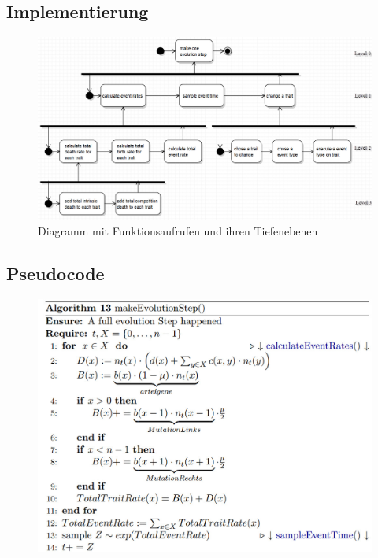 \documentclass{beamer}
\begin{document}
\subsection{Implementierung}
\begin{frame}
	\begin{figure}[H]
		\centering
		\includegraphics[width=1\linewidth]{../UMLs/PseudoCodeForBThesis}
		\caption{Diagramm mit Funktionsaufrufen und ihren Tiefenebenen}
	\end{figure}
\end{frame}

\subsection{Pseudocode}
\begin{frame}
	\begin{figure}[H]
		\centering
		\includegraphics[width=1\linewidth]{./Pictures/Alg1}
	\end{figure}
\end{frame}
\end{document}
